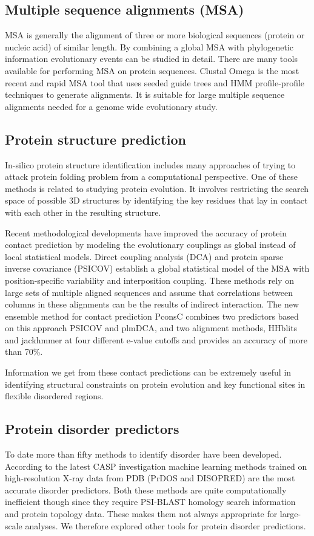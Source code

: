 \documentclass[11pt, a4paper,oneside]{report}
\begin{document}
\subsection{Multiple sequence alignments (MSA)}
 MSA is generally the alignment of three or more biological sequences (protein or nucleic acid) of similar length. By combining a global MSA with phylogenetic information evolutionary events can be studied in detail. There are many tools available for performing MSA on protein sequences. Clustal Omega is the most recent and rapid MSA tool\cite{Sievers2011} that uses seeded guide trees and HMM profile-profile techniques to generate alignments. It is suitable for large multiple sequence alignments needed for a genome wide evolutionary study. 

\subsection{Protein structure prediction}
In-silico protein structure identification includes many approaches of trying to attack protein folding problem from a computational perspective. One of these methods is  related to studying protein evolution. It involves restricting the search space of possible 3D structures by identifying the key residues that lay in contact with each other in the resulting structure. 

 Recent methodological developments have improved the accuracy of protein contact prediction by modeling the evolutionary couplings as global instead of local statistical models.  Direct coupling analysis (DCA)\cite{Morcos2011} and protein sparse inverse covariance (PSICOV)\cite{Jones2012} establish a global statistical model of the MSA with position-specific variability and interposition coupling. These methods rely on large sets of multiple aligned sequences and assume that correlations between columns in these alignments can be the results of indirect interaction. The new ensemble method for contact prediction PconsC\cite{Skwark2013} combines two predictors based on this approach PSICOV and plmDCA, and two alignment methods, HHblits and jackhmmer at four different e-value cutoffs and provides an accuracy of more than 70\%. 
 
Information we get from these contact predictions can be extremely useful in identifying structural constraints on protein evolution and key functional sites in flexible disordered regions.

\subsection{Protein disorder predictors}
To date more than fifty methods to identify disorder have been developed\cite{He2009}.  
According to the latest CASP investigation machine learning methods trained on high-resolution X-ray data from PDB (PrDOS and DISOPRED) are the most accurate disorder predictors\cite{Monastyrskyy2011}. Both these methods are quite computationally inefficient though since they require PSI-BLAST homology search information and protein topology data\cite{Ward2004}. These makes them not always appropriate for large-scale analyses.  We therefore explored other tools for protein disorder predictions. 
\end{document}
